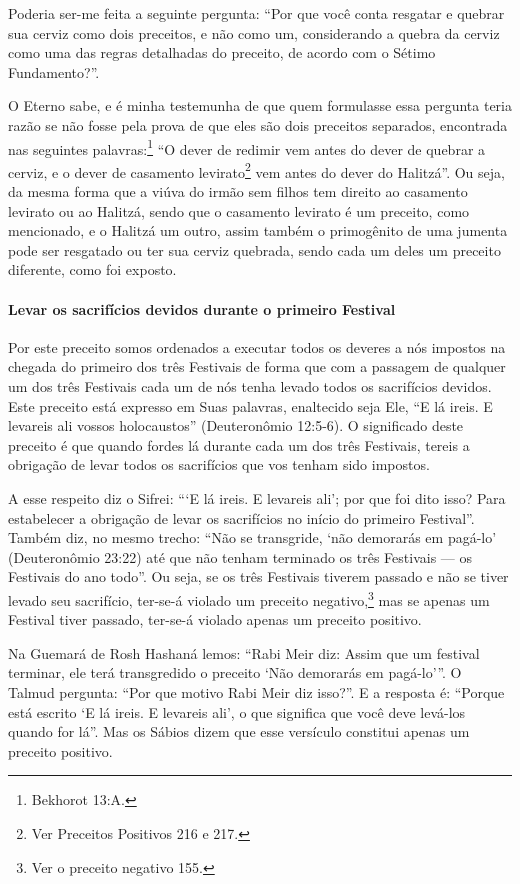 Poderia ser-me feita a seguinte pergunta: ``Por que você conta resgatar
e quebrar sua cerviz como dois preceitos, e não como um, considerando a
quebra da cerviz como uma das regras detalhadas do preceito, de acordo
com o Sétimo Fundamento?''.

O Eterno sabe, e é minha testemunha de que quem formulasse essa pergunta
teria razão se não fosse pela prova de que eles são dois preceitos
separados, encontrada nas seguintes palavras:\footnote{Bekhorot 13:A.} ``O
dever de redimir vem antes do dever de quebrar a cerviz, e o dever de
casamento levirato\footnote{Ver Preceitos Positivos 216 e 217.} vem antes do dever do
Halitzá''. Ou seja, da mesma forma que a viúva
do irmão sem filhos tem direito ao casamento levirato ou ao Halitzá,
sendo que o casamento levirato é um preceito, como mencionado, e o
Halitzá um outro, assim também o primogênito de uma jumenta pode ser
resgatado ou ter sua cerviz quebrada, sendo cada um deles um preceito
diferente, como foi exposto.

\paragraph{Levar os sacrifícios devidos durante o primeiro Festival}

Por este preceito somos ordenados a executar todos os deveres a nós
impostos na chegada do primeiro dos três Festivais de forma que com a
passagem de qualquer um dos três Festivais cada um de nós tenha levado
todos os
sacrifícios devidos. Este preceito está expresso em Suas palavras,
enaltecido seja
Ele, ``E lá ireis. E levareis ali vossos holocaustos'' (Deuteronômio
12:5-6). O significado deste preceito é que quando fordes lá durante
cada um dos três Festivais, tereis a obrigação de levar todos os
sacrifícios que vos tenham sido impostos.

A esse respeito diz o Sifrei: ```E lá ireis. E levareis ali'; por que
foi dito isso? Para estabelecer a obrigação de levar os sacrifícios no
início do primeiro Festival''. Também diz, no mesmo trecho: ``Não se
transgride, `não demorarás em pagá-lo' (Deuteronômio 23:22) até que não
tenham terminado os três Festivais --- os Festivais do ano todo''. Ou seja, se os três
Festivais tiverem passado e não se tiver levado seu sacrifício, ter-se-á violado um
preceito negativo,\footnote{Ver o preceito negativo 155.} mas se apenas um Festival tiver passado,
ter-se-á violado apenas um preceito positivo.

Na Guemará de Rosh Hashaná lemos: ``Rabi Meir diz: Assim que um festival
terminar, ele terá transgredido o preceito `Não demorarás em pagá-lo'''.
O Talmud pergunta: ``Por que motivo Rabi Meir diz isso?''. E a resposta
é: ``Porque está escrito `E lá ireis. E levareis ali', o que significa
que você deve levá-los quando for lá''. Mas os Sábios dizem que esse
versículo constitui apenas um preceito positivo.

